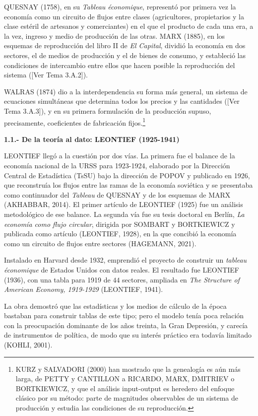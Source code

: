 \documentclass[10pt,a4paper]{article}
\newcommand{\authorfont}[1]{{\fontfamily{EBGaramond-TLF}\selectfont #1}}
\begin{document}
QUESNAY (1758), en su \textit{Tableau économique}, representó por primera vez la economía como un circuito de flujos entre clases (agricultores, propietarios y la clase estéril de artesanos y comerciantes) en el que el producto de cada una era, a la vez, ingreso y medio de producción de las otras. MARX (1885), en los esquemas de reproducción del libro II de \textit{El Capital}, dividió la economía en dos sectores, el de medios de producción y el de bienes de consumo, y estableció las condiciones de intercambio entre ellos que hacen posible la reproducción del sistema ([\authorfont{Ver Tema 3.A.2}]). 

WALRAS (1874) dio a la interdependencia su forma más general, un sistema de ecuaciones simultáneas que determina todos los precios y las cantidades ([\authorfont{Ver Tema 3.A.3}]), y en su primera formulación de la producción supuso, precisamente, coeficientes de fabricación fijos.\footnote{%
  KURZ y SALVADORI (2000) han mostrado que la genealogía es aún más larga, de PETTY y CANTILLON a RICARDO, MARX, DMITRIEV o BORTKIEWICZ, y que el análisis input-output es heredero del enfoque clásico por su método: parte de magnitudes observables de un sistema de producción y estudia las condiciones de su reproducción.
}

\textbf{1.1.- De la teoría al dato: LEONTIEF (1925-1941)}

LEONTIEF llegó a la cuestión por dos vías. La primera fue el balance de la economía nacional de la URSS para 1923-1924, elaborado por la Dirección Central de Estadística (TsSU) bajo la dirección de POPOV y publicado en 1926, que reconstruía los flujos entre las ramas de la economía soviética y se presentaba como continuador del \textit{Tableau} de QUESNAY y de los esquemas de MARX (AKHABBAR, 2014). El primer artículo de LEONTIEF (1925) fue un análisis metodológico de ese balance. La segunda vía fue su tesis doctoral en Berlín, \textit{La economía como flujo circular}, dirigida por SOMBART y BORTKIEWICZ y publicada como artículo (LEONTIEF, 1928), en la que concibió la economía como un circuito de flujos entre sectores (HAGEMANN, 2021).

Instalado en Harvard desde 1932, emprendió el proyecto de construir un \textit{tableau économique} de Estados Unidos con datos reales. El resultado fue LEONTIEF (1936), con una tabla para 1919 de $44$ sectores, ampliada en \textit{The Structure of American Economy, 1919-1929} (LEONTIEF, 1941). 

La obra demostró que las estadísticas y los medios de cálculo de la época bastaban para construir tablas de este tipo; pero el modelo tenía poca relación con la preocupación dominante de los años treinta, la Gran Depresión, y carecía de instrumentos de política, de modo que su interés práctico era todavía limitado (KOHLI, 2001).
\end{document}
